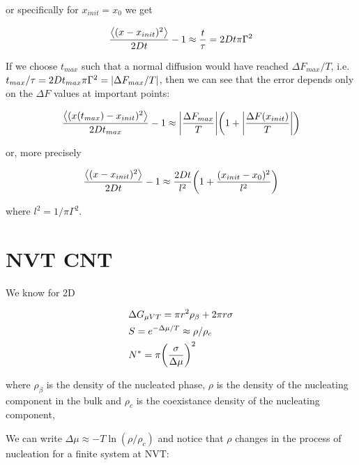\documentclass[a4paper,12pt]{article} %
\begin{document}
or specifically for $x_{init} = x_0$ we get

\begin{equation}
\frac{\expval{(x - x_{init})^2}}{2 D t} - 1 \approx \frac{t}{\tau} = 2 D t \pi \Gamma^2
\end{equation}

If we choose $t_{max}$ such that a normal diffusion would have reached $\Delta F_{max}/T$, i.e. $t_{max} / \tau = 2 D t_{max} \pi \Gamma^2 = \abs{\Delta F_{max} / T}$, then we can see that the error depends only on the $\Delta F$ values at important points:

\begin{equation}
\frac{\expval{(x(t_{max}) - x_{init})^2}}{2 D t_{max}} - 1 \approx \abs{\frac{\Delta F_{max}}{T}} \qty(1 + \abs{\frac{\Delta F(x_{init})}{T}})
\end{equation}

or, more precisely

\begin{equation}
\frac{\expval{(x - x_{init})^2}}{2 D t} - 1 \approx \frac{2 D t}{l^2} \qty(1 + \frac{(x_{init} - x_0)^2}{l^2} )
\end{equation}

where $l^2 = 1/\pi \Gamma^2$.

\newpage

\section{NVT CNT}

We know for 2D

\begin{equation}
\begin{aligned}
& \Delta G_{\mu V T} = \pi r^2 \rho_{\beta} + 2 \pi r \sigma \\
& S = e^{-\Delta \mu / T} \approx \rho / \rho_c \\
& N^* = \pi \qty(\frac{\sigma}{\Delta \mu})^2 \\
\end{aligned}
\end{equation}

where $\rho_{\beta}$ is the density of the nucleated phase, $\rho$ is the density of the nucleating component in the bulk and $\rho_c$ is the coexistance density of the nucleating component,

We can write $\Delta \mu \approx -T \ln(\rho / \rho_c)$ and notice that $\rho$ changes in the process of nucleation for a finite system at NVT:
\end{document}

